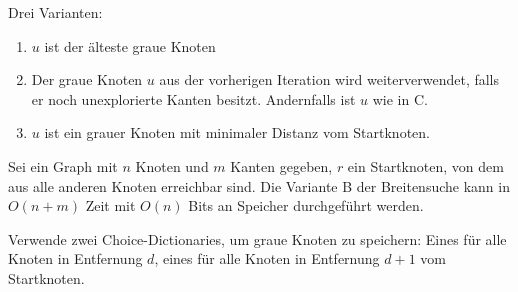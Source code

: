\documentclass{cheat-sheet}
\begin{document}
\begin{defn}
  Drei Varianten:
  \begin{enumerate}[label=\Alph*.,leftmargin=2em]
    \item $u$ ist der älteste graue Knoten
    \item Der graue Knoten $u$ aus der vorherigen Iteration wird weiterverwendet, falls er noch unexplorierte Kanten besitzt.
    Andernfalls ist $u$ wie in C.
    \item $u$ ist ein grauer Knoten mit minimaler Distanz vom Startknoten.
  \end{enumerate}
\end{defn}

\begin{thm}
  Sei ein Graph mit $n$ Knoten und $m$ Kanten gegeben, $r$ ein Startknoten, von dem aus alle anderen Knoten erreichbar sind.
  Die Variante B der Breitensuche kann in $O(n + m)$ Zeit mit $O(n)$ Bits an Speicher durchgeführt werden.
\end{thm}

\begin{idee}
  Verwende zwei Choice-Dictionaries, um graue Knoten zu speichern: Eines für alle Knoten in Entfernung $d$, eines für alle Knoten in Entfernung $d + 1$ vom Startknoten.
\end{idee}
\end{document}
